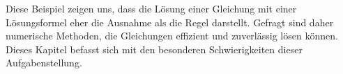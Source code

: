 Diese Beispiel zeigen uns, dass die Lösung einer Gleichung mit
einer Lösungsformel eher die Ausnahme als die Regel darstellt.
Gefragt sind daher numerische Methoden, die Gleichungen effizient
und zuverlässig lösen können.
Dieses Kapitel befasst sich mit den besonderen Schwierigkeiten dieser
Aufgabenstellung.






